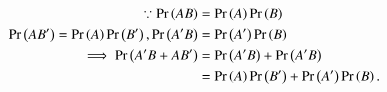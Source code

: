 \begin{align}
	\because \pr{AB} &= \pr{A} \pr{B}
	\\
	\pr{AB^\prime } = \pr{A} \pr{B^\prime },
	\pr{A^\prime B} &= \pr{A^\prime } \pr{B}
	\\
	\implies \pr{A^\prime B+AB^\prime } &= \pr{A^\prime B}+\pr{A^\prime B}
	\\
	&=\pr{A} \pr{B^\prime }+ \pr{A^\prime } \pr{B}.
\end{align}
